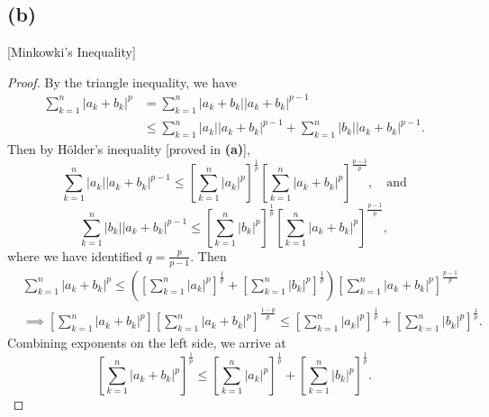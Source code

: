 \documentclass{article}
\begin{document}
\subsection*{(b)}
[Minkowki's Inequality]
\begin{proof}
	By the triangle inequality, we have
	\begin{align}
		\sum_{k=1}^n|a_k + b_k|^p &= \sum_{k=1}^n |a_k + b_k||a_k + b_k|^{p-1}\\
		&\leq \sum_{k=1}^n|a_k||a_k + b_k|^{p-1} + \sum_{k=1}^n|b_k||a_k + b_k|^{p-1}.
	\end{align}
	Then by Hölder's inequality [proved in \textbf{(a)}], 
	\begin{equation}
		\sum_{k=1}^n |a_k||a_k + b_k|^{p-1}\leq \left[\sum_{k=1}^n |a_k|^p\right]^\frac{1}{p} \left[\sum_{k=1}^n |a_k + b_k|^p\right]^\frac{p-1}{p}, \quad \textrm{and}
	\end{equation}
	\begin{equation}
		\sum_{k=1}^n |b_k||a_k + b_k|^{p-1}\leq \left[\sum_{k=1}^n |b_k|^p\right]^\frac{1}{p} \left[\sum_{k=1}^n |a_k + b_k|^p\right]^\frac{p-1}{p},
	\end{equation}
	where we have identified $q=\frac{p}{p-1}$. Then
	\begin{align}
		&\sum_{k=1}^n|a_k + b_k|^p \leq \left(\left[\sum_{k=1}^n |a_k|^p\right]^\frac{1}{p} + \left[\sum_{k=1}^n |b_k|^p\right]^\frac{1}{p}\right)\left[\sum_{k=1}^n |a_k + b_k|^p\right]^\frac{p-1}{p} \\
		&\implies \left[\sum_{k=1}^n|a_k + b_k|^p\right] \left[\sum_{k=1}^n |a_k + b_k|^p\right]^\frac{1-p}{p} \leq \left[\sum_{k=1}^n |a_k|^p\right]^\frac{1}{p} + \left[\sum_{k=1}^n |b_k|^p\right]^\frac{1}{p}. 
	\end{align}
	Combining exponents on the left side, we arrive at
	\begin{equation}
		\left[\sum_{k=1}^n |a_k + b_k|^p\right]^\frac{1}{p} \leq \left[\sum_{k=1}^n |a_k|^p\right]^\frac{1}{p} + \left[\sum_{k=1}^n |b_k|^p\right]^\frac{1}{p}.
	\end{equation}
\end{proof}
\end{document}
